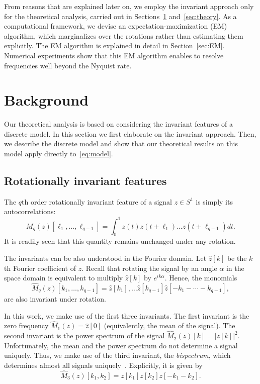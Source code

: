 \documentclass[english,12pt]{article}
\newcommand{\I}{\iota}
\numberwithin{equation}{section}
\numberwithin{thm}{section} %
\begin{document}
From reasons that are explained later on, we employ the invariant approach only for the theoretical analysis, carried out in Sections~\ref{sec:background} and~\ref{sec:theory}. As a computational framework, we devise an expectation-maximization (EM) algorithm, which marginalizes over the rotations rather than estimating them explicitly.  The EM algorithm is explained in detail in Section~\ref{sec:EM}.
Numerical experiments show that this EM algorithm enables to resolve frequencies well beyond the Nyquist rate.

\section{Background} \label{sec:background}

Our theoretical analysis is based on considering the invariant features of a discrete model. In this section we first elaborate on the invariant approach. Then, we describe the discrete model and show that our theoretical results on this model apply directly to~\eqref{eq:model}.

\subsection{Rotationally invariant features} \label{sec:invariants}

The $q$th order rotationally invariant feature of a signal $z\in S^1$ is simply its autocorrelations:
\begin{equation}
M_q(z)[\ell_1,\ldots,\ell_{q-1}]=\int_{0}^1 z(t)z(t+\ell_1)\ldots z(t+\ell_{q-1})dt.
\end{equation} 
It is readily seen that this quantity remains unchanged under any rotation. 

The invariants  can be also understood in the Fourier domain.
Let ${\hat{z}[k]}$ be the $k$th Fourier coefficient of $z$. Recall that rotating the signal by an angle $\alpha$ in the space domain is equivalent to multiply ${\hat{z}[k]}$ by $e^{\I k\alpha}$. Hence, the monomials
\begin{equation}
\hat{M}_q(z)[k_1,\ldots,k_{q-1}]=\hat{z}[k_1],\ldots \hat{z}[k_{q-1}]{\hat{z}[-k_1-\cdots-k_{q-1}]},
\end{equation} 
are also invariant under rotation.

In this work, we make use of the first three invariants. The first invariant is the zero frequency $\hat{M}_1(z) = \hat{z}[0]$ (equivalently, the mean of the signal). The second invariant is the power spectrum of the signal $\hat{M}_2(z)[k]=|z[k]|^2$. Unfortunately, the mean and the power spectrum do not determine a signal uniquely. 
Thus, we make use of the third invariant, the \emph{bispectrum}, which determines almost all signals uniquely~\cite{tukey1953spectral,sadler1992shift}. Explicitly, it is given by
\begin{equation}
\hat{M}_3(z)[k_1,k_2] = z[k_1]z[k_2]z[-k_1-k_2].
\end{equation}
\end{document}
